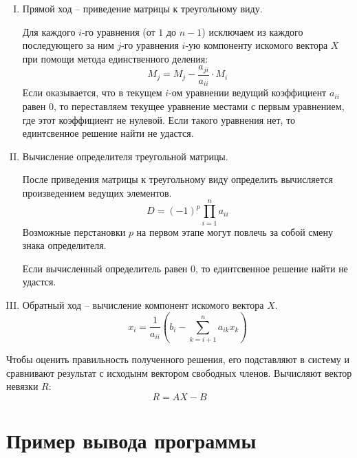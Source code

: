 \documentclass[14pt]{article}
\begin{document}
\begin{enumerate}[I.]
    \item Прямой ход -- приведение матрицы к треугольному виду.

    Для каждого $i$-го уравнения (от $1$ до $n-1$) исключаем из каждого последующего за ним $j$-го уравнения $i$-ую компоненту искомого вектора $X$ при помощи метода единственного деления:
    $$
    M_j = M_j - \frac{a_{ji}}{a_{ii}} \cdot M_i
    $$
    Если оказывается, что в текущем $i$-ом уравнении ведущий коэффициент $a_{ii}$ равен 0, то переставляем текущее уравнение местами с первым уравнением, где этот коэффициент не нулевой. Если такого уравнения нет, то единтсвенное решение найти не удастся.

    \item Вычисление определителя треугольной матрицы.
    
    После приведения матрицы к треугольному виду определить вычисляется произведением ведущих элементов. 
    $$
    D = (-1)^p \prod \limits_{i = 1}^{n} a_{ii}
    $$
    Возможные перстановки $p$ на первом этапе могут повлечь за собой смену знака определителя. 

    Если вычисленный определитель равен 0, то единтсвенное решение найти не удастся.
    \item Обратный ход -- вычисление компонент искомого вектора $X$.
    $$
    x_i = \frac{1}{a_{ii}} (b_i - \sum \limits_{k=i+1}^{n} a_{ik}x_k)
    $$
\end{enumerate}

Чтобы оценить правильность полученного решения, его подставляют в систему и сравнивают результат с исходынм вектором свободных членов. Вычисляют вектор невязки $R$:
$$
R = AX - B
$$

\newpage

\section{Пример вывода программы}
\end{document}
